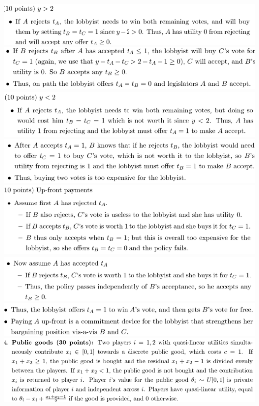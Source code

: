 \documentclass[8pt,landscape]{extarticle}
\begin{document}
\begin{multicols*}{3}
    \includegraphics[width=0.71\linewidth,keepaspectratio]{Screenshots/Screenshot 2024-03-11 134935.png}
    \includegraphics[width=0.69\linewidth,keepaspectratio]{Screenshots/Screenshot 2024-03-11 134940.png}
    \includegraphics[width=0.7\linewidth,keepaspectratio]{Screenshots/Screenshot 2024-03-11 134947.png}
    \includegraphics[width=0.69\linewidth,keepaspectratio]{Screenshots/Screenshot 2024-03-11 134950.png}
    \includegraphics[width=0.7\linewidth,keepaspectratio]{Screenshots/Screenshot 2024-03-11 134957.png}
    \includegraphics[width=0.7\linewidth,keepaspectratio]{Screenshots/Screenshot 2024-03-11 135001.png}
    \includegraphics[width=0.69\linewidth,keepaspectratio]{Screenshots/Screenshot 2024-03-11 135005.png}
    \includegraphics[width=0.77\linewidth,keepaspectratio]{Screenshots/Screenshot 2024-03-11 135111.png}

\end{multicols*}
\end{document}
